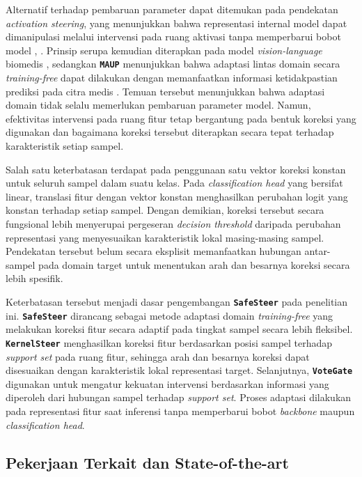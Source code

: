 \documentclass[conference]{IEEEtran}
\newcommand{\nama}[1]{\textbf{\texttt{#1}}}
\begin{document}
Alternatif terhadap pembaruan parameter dapat ditemukan pada pendekatan \textit{activation steering}, yang menunjukkan bahwa representasi internal model dapat dimanipulasi melalui intervensi pada ruang aktivasi tanpa memperbarui bobot model \cite{b10}, \cite{b11}. Prinsip serupa kemudian diterapkan pada model \textit{vision-language} biomedis \cite{b12}, sedangkan \nama{MAUP} menunjukkan bahwa adaptasi lintas domain secara \textit{training-free} dapat dilakukan dengan memanfaatkan informasi ketidakpastian prediksi pada citra medis \cite{b13}. Temuan tersebut menunjukkan bahwa adaptasi domain tidak selalu memerlukan pembaruan parameter model. Namun, efektivitas intervensi pada ruang fitur tetap bergantung pada bentuk koreksi yang digunakan dan bagaimana koreksi tersebut diterapkan secara tepat terhadap karakteristik setiap sampel.

Salah satu keterbatasan terdapat pada penggunaan satu vektor koreksi konstan untuk seluruh sampel dalam suatu kelas. Pada \textit{classification head} yang bersifat linear, translasi fitur dengan vektor konstan menghasilkan perubahan logit yang konstan terhadap setiap sampel. Dengan demikian, koreksi tersebut secara fungsional lebih menyerupai pergeseran \textit{decision threshold} daripada perubahan representasi yang menyesuaikan karakteristik lokal masing-masing sampel. Pendekatan tersebut belum secara eksplisit memanfaatkan hubungan antar-sampel pada domain target untuk menentukan arah dan besarnya koreksi secara lebih spesifik.

Keterbatasan tersebut menjadi dasar pengembangan \nama{SafeSteer} pada penelitian ini. \nama{SafeSteer} dirancang sebagai metode adaptasi domain \textit{training-free} yang melakukan koreksi fitur secara adaptif pada tingkat sampel secara lebih fleksibel. \nama{KernelSteer} menghasilkan koreksi fitur berdasarkan posisi sampel terhadap \textit{support set} pada ruang fitur, sehingga arah dan besarnya koreksi dapat disesuaikan dengan karakteristik lokal representasi target. Selanjutnya, \nama{VoteGate} digunakan untuk mengatur kekuatan intervensi berdasarkan informasi yang diperoleh dari hubungan sampel terhadap \textit{support set}. Proses adaptasi dilakukan pada representasi fitur saat inferensi tanpa memperbarui bobot \textit{backbone} maupun \textit{classification head}.

\subsection{Pekerjaan Terkait dan State-of-the-art}
\end{document}
